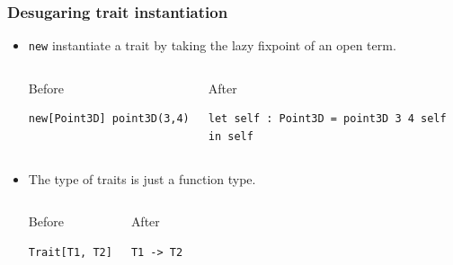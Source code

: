 \documentclass{beamer}
\begin{document}
\begin{frame}[fragile]
  \frametitle{Desugaring trait instantiation}

  \begin{itemize}
  \item \lstinline{new} instantiate a trait by taking the lazy fixpoint of an open term.

  \begin{columns}[t]


  \begin{exampleblock}{Before}
\begin{lstlisting}
new[Point3D] point3D(3,4)
\end{lstlisting}
  \end{exampleblock}


  \begin{exampleblock}{After}
\begin{lstlisting}
let self : Point3D = point3D 3 4 self
in self
\end{lstlisting}
  \end{exampleblock}

  \end{columns}

  \pause

\vskip10pt

 \item The type of traits is just a function type.

  \begin{columns}[t]


  \begin{exampleblock}{Before}
\begin{lstlisting}
Trait[T1, T2]
\end{lstlisting}
  \end{exampleblock}


  \begin{exampleblock}{After}
\begin{lstlisting}
T1 -> T2
\end{lstlisting}
  \end{exampleblock}

  \end{columns}

  \end{itemize}




\end{frame}
\end{document}
